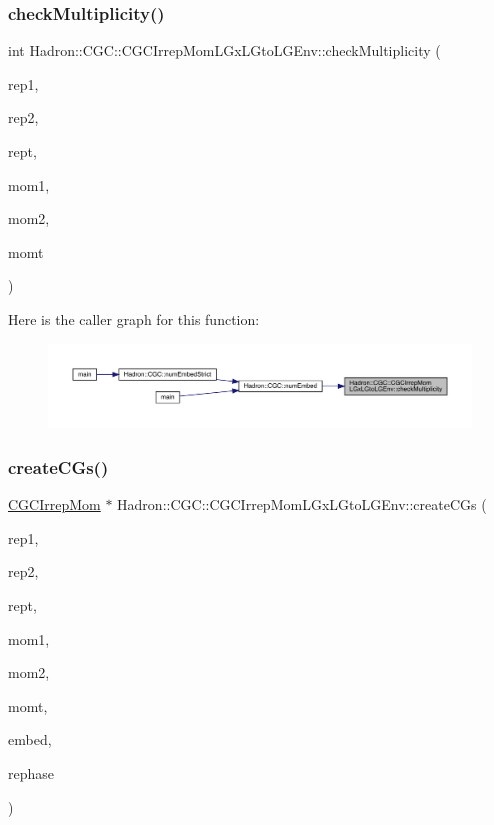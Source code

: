 \subsubsection{\texorpdfstring{checkMultiplicity()}{checkMultiplicity()}}
{\footnotesize\ttfamily int Hadron\+::\+C\+G\+C\+::\+C\+G\+C\+Irrep\+Mom\+L\+Gx\+L\+Gto\+L\+G\+Env\+::check\+Multiplicity (\begin{DoxyParamCaption}\item[{const std\+::string \&}]{rep1,  }\item[{const std\+::string \&}]{rep2,  }\item[{const std\+::string \&}]{rept,  }\item[{const Array\+Int \&}]{mom1,  }\item[{const Array\+Int \&}]{mom2,  }\item[{const Array\+Int \&}]{momt }\end{DoxyParamCaption})}

Here is the caller graph for this function\+:\nopagebreak
\begin{figure}[H]
\begin{center}
\leavevmode
\includegraphics[width=350pt]{dd/d8a/namespaceHadron_1_1CGC_1_1CGCIrrepMomLGxLGtoLGEnv_ac903fc6025ce80a33975cbd2b635e7df_icgraph}
\end{center}
\end{figure}
\mbox{\label{namespaceHadron_1_1CGC_1_1CGCIrrepMomLGxLGtoLGEnv_aac28a74a71012455c31bc9ba558b35da}} 
\subsubsection{\texorpdfstring{createCGs()}{createCGs()}}
{\footnotesize\ttfamily \mbox{\hyperlink{classHadron_1_1CGCIrrepMom}{C\+G\+C\+Irrep\+Mom}} $\ast$ Hadron\+::\+C\+G\+C\+::\+C\+G\+C\+Irrep\+Mom\+L\+Gx\+L\+Gto\+L\+G\+Env\+::create\+C\+Gs (\begin{DoxyParamCaption}\item[{const std\+::string \&}]{rep1,  }\item[{const std\+::string \&}]{rep2,  }\item[{const std\+::string \&}]{rept,  }\item[{const Array\+Int \&}]{mom1,  }\item[{const Array\+Int \&}]{mom2,  }\item[{const Array\+Int \&}]{momt,  }\item[{int}]{embed,  }\item[{bool}]{rephase }\end{DoxyParamCaption})}

